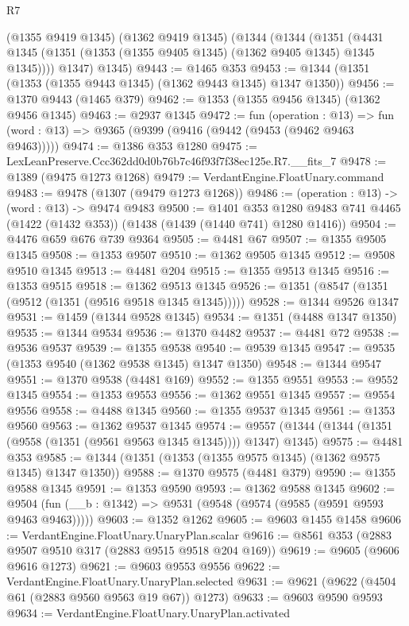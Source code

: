 \begin{lexlean}{R7}
\begin{coremodule}
    (@1355 @9419 @1345)
    (@1362 @9419 @1345)
    (@1344
      (@1344
        (@1351 (@4431 @1345 (@1351 (@1353 (@1355 @9405 @1345) (@1362 @9405 @1345) @1345 @1345))))
        @1347)
      @1345)
@9443 := @1465 @353
@9453 := @1344 (@1351 (@1353 (@1355 @9443 @1345) (@1362 @9443 @1345) @1347 @1350))
@9456 := @1370 @9443 (@1465 @379)
@9462 := @1353 (@1355 @9456 @1345) (@1362 @9456 @1345)
@9463 := @2937 @1345
@9472 := fun (operation : @13) =>
  fun (word : @13) => @9365 (@9399 (@9416 (@9442 (@9453 (@9462 @9463 @9463)))))
@9474 := @1386 @353 @1280
@9475 := LexLeanPreserve.Ccc362dd0d0b76b7c46f93f7f38ec125e.R7.__fits_7
@9478 := @1389 (@9475 @1273 @1268)
@9479 := VerdantEngine.FloatUnary.command
@9483 := @9478 (@1307 (@9479 @1273 @1268))
@9486 := (operation : @13) -> (word : @13) -> @9474 @9483
@9500 := @1401
    @353
    @1280
    @9483
    @741
    @4465
    (@1422 (@1432 @353))
    (@1438 (@1439 (@1440 @741) @1280 @1416))
@9504 := @4476 @659 @676 @739 @9364
@9505 := @4481 @67
@9507 := @1355 @9505 @1345
@9508 := @1353 @9507
@9510 := @1362 @9505 @1345
@9512 := @9508 @9510 @1345
@9513 := @4481 @204
@9515 := @1355 @9513 @1345
@9516 := @1353 @9515
@9518 := @1362 @9513 @1345
@9526 := @1351 (@8547 (@1351 (@9512 (@1351 (@9516 @9518 @1345 @1345)))))
@9528 := @1344 @9526 @1347
@9531 := @1459 (@1344 @9528 @1345)
@9534 := @1351 (@4488 @1347 @1350)
@9535 := @1344 @9534
@9536 := @1370 @4482
@9537 := @4481 @72
@9538 := @9536 @9537
@9539 := @1355 @9538
@9540 := @9539 @1345
@9547 := @9535 (@1353 @9540 (@1362 @9538 @1345) @1347 @1350)
@9548 := @1344 @9547
@9551 := @1370 @9538 (@4481 @169)
@9552 := @1355 @9551
@9553 := @9552 @1345
@9554 := @1353 @9553
@9556 := @1362 @9551 @1345
@9557 := @9554 @9556
@9558 := @4488 @1345
@9560 := @1355 @9537 @1345
@9561 := @1353 @9560
@9563 := @1362 @9537 @1345
@9574 := @9557 (@1344 (@1344 (@1351 (@9558 (@1351 (@9561 @9563 @1345 @1345)))) @1347) @1345)
@9575 := @4481 @353
@9585 := @1344 (@1351 (@1353 (@1355 @9575 @1345) (@1362 @9575 @1345) @1347 @1350))
@9588 := @1370 @9575 (@4481 @379)
@9590 := @1355 @9588 @1345
@9591 := @1353 @9590
@9593 := @1362 @9588 @1345
@9602 := @9504 (fun (__b : @1342) => @9531 (@9548 (@9574 (@9585 (@9591 @9593 @9463 @9463)))))
@9603 := @1352 @1262
@9605 := @9603 @1455 @1458
@9606 := VerdantEngine.FloatUnary.UnaryPlan.scalar
@9616 := @8561 @353 (@2883 @9507 @9510 @317 (@2883 @9515 @9518 @204 @169))
@9619 := @9605 (@9606 @9616 @1273)
@9621 := @9603 @9553 @9556
@9622 := VerdantEngine.FloatUnary.UnaryPlan.selected
@9631 := @9621 (@9622 (@4504 @61 (@2883 @9560 @9563 @19 @67)) @1273)
@9633 := @9603 @9590 @9593
@9634 := VerdantEngine.FloatUnary.UnaryPlan.activated

\end{coremodule}
\end{lexlean}
